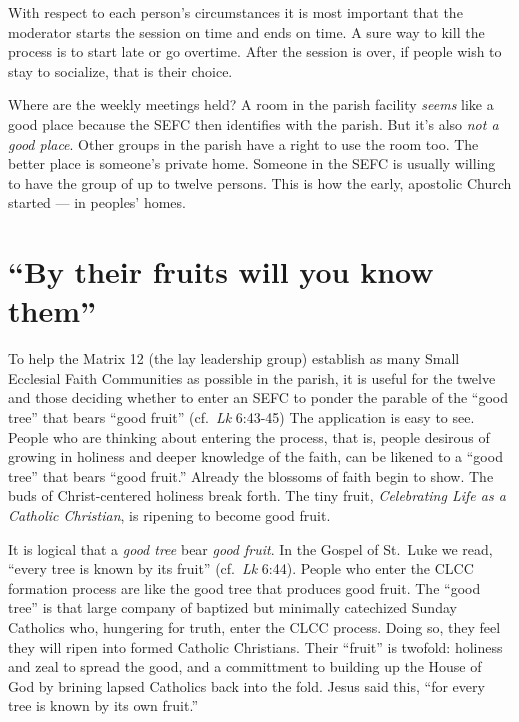 \documentclass{article}
\begin{document}
With respect to each person's circumstances it is most important that the
moderator starts the session on time and ends on time. A sure way to kill the
process is to start late or go overtime. After the session is over, if people
wish to stay to socialize, that is their choice.

Where are the weekly meetings held? A room in the parish facility \emph{seems}
like a good place because the SEFC then identifies with the parish. But it's
also \emph{not a good place}. Other groups in the parish have a right to use the
room too. The better place is someone's private home. Someone in the SEFC is
usually willing to have the group of up to twelve persons. This is how the
early, apostolic Church started --- in peoples' homes.


\section{``By their fruits will you know them''}

To help the Matrix 12 (the lay leadership group) establish as many Small
Ecclesial Faith Communities as possible in the parish, it is useful for the
twelve and those deciding whether to enter an SEFC to ponder the parable of the
``good tree'' that bears ``good fruit'' (cf.\ \emph{Lk} 6:43-45) The application
is easy to see. People who are thinking about entering the process, that is,
people desirous of growing in holiness and deeper knowledge of the faith, can be
likened to a ``good tree'' that bears ``good fruit.'' Already the blossoms of
faith begin to show. The buds of Christ-centered holiness break forth. The tiny
fruit, \emph{Celebrating Life as a Catholic Christian}, is ripening to become
good fruit.

It is logical that a \emph{good tree} bear \emph{good fruit}. In the Gospel of
St.\ Luke we read, ``every tree is known by its fruit'' (cf.\ \emph{Lk}
6:44). People who enter the CLCC formation process are like the good tree that
produces good fruit. The ``good tree'' is that large company of baptized but
minimally catechized Sunday Catholics who, hungering for truth, enter the CLCC
process. Doing so, they feel they will ripen into formed Catholic
Christians. Their ``fruit'' is twofold: holiness and zeal to spread the good,
and a committment to building up the House of God by brining lapsed Catholics
back into the fold. Jesus said this, ``for every tree is known by its own
fruit.''
\end{document}
